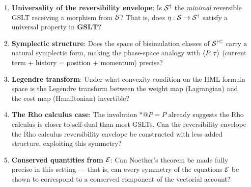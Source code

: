 \begin{enumerate}[itemsep=4pt]
  \item \textbf{Universality of the reversibility envelope}: Is $\mathcal{S}^\dagger$
        the \emph{minimal} reversible GSLT receiving a morphism from $\mathcal{S}$?
        That is, does $\eta : \mathcal{S} \to \mathcal{S}^\dagger$ satisfy a universal
        property in $\mathbf{GSLT}$?

  \item \textbf{Symplectic structure}: Does the space of bisimulation classes
        of $\mathcal{S}^{\dagger\mathbb{C}}$ carry a natural symplectic form, making the
        phase-space analogy with $\langle P, \tau \rangle$ (current term
        + history = position + momentum) precise?

  \item \textbf{Legendre transform}: Under what convexity condition on the
        HML formula space is the Legendre transform between the weight map
        (Lagrangian) and the cost map (Hamiltonian) invertible?

  \item \textbf{The Rho calculus case}: The involution ${*}{@}P = P$
        already suggests the Rho calculus is closer to self-dual than most
        GSLTs.  Can the reversibility envelope the Rho calculus reversibility envelope be constructed
        with less added structure, exploiting this symmetry?

  \item \textbf{Conserved quantities from $\mathcal{E}$}: Can Noether's theorem
        be made fully precise in this setting --- that is, can every symmetry
        of the equations $\mathcal{E}$ be shown to correspond to a conserved component
        of the vectorial account?
\end{enumerate}


